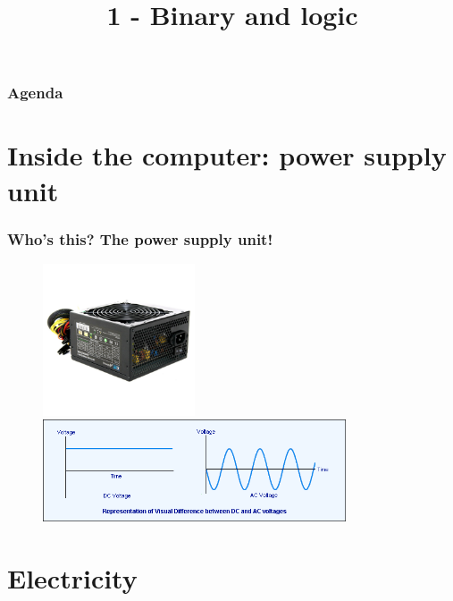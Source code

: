 \documentclass{beamer}
\title{1 - Binary and logic}
\author{}
\date{}
\begin{document}
\frame{\titlepage}

\begin{frame}
  \frametitle{Agenda}
  \tableofcontents
\end{frame}

\section{Inside the computer: power supply unit}

\begin{frame}
  \frametitle{Who's this? The power supply unit!}
  \begin{figure}
    \centering
    \includegraphics[width=0.4\textwidth]{res/psu.jpg} \\
    \includegraphics[width=0.8\textwidth]{res/acdc.png}
  \end{figure}

\end{frame}

\section{Electricity}
\end{document}
